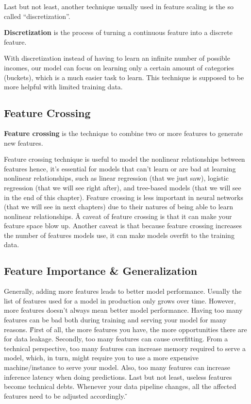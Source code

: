 Last but not least, another technique usually used in feature scaling is the so called ``discretization''.

\bd[Discretization]
\textbf{Discretization} is the process of turning a continuous feature into a discrete feature.
\ed


With discretization instead of having to learn an infinite number of possible incomes, our model can focus on
learning only a certain amount of categories (buckets), which is a much easier task to learn. This technique is
supposed to be more helpful with limited training data.

\subsection{Feature Crossing}

\textbf{Feature crossing} is the technique to combine two or more features to generate new features.
\ed

Feature crossing technique is useful to model the nonlinear relationships between features hence, it's essential for
models that can't learn or are bad at learning nonlinear relationships, such as linear regression (that we just saw),
logistic regression (that we will see right after), and tree-based models (that we will see in the end of this chapter).
Feature crossing is less important in neural networks (that we will see in next chapters) due to their natures of being
able to learn nonlinear relationships. \v

A caveat of feature crossing is that it can make your feature space blow up. Another caveat is that because feature
crossing increases the number of features models use, it can make models overfit to the training data.

\subsection{Feature Importance \& Generalization}

Generally, adding more features leads to better model performance. Usually the list of features used for a model in
production only grows over time. However, more features doesn't always mean better model performance. Having too many
features can be bad both during training and serving your model for many reasons. \v

First of all, the more features you have, the more opportunities there are for data leakage. Secondly, too many
features can cause overfitting. From a technical perspective, too many features can increase memory required to serve
a model, which, in turn, might require you to use a more expensive machine/instance to serve your model. Also, too
many features can increase inference latency when doing predictions. Last but not least, useless features become
technical debts. Whenever your data pipeline changes, all the affected features need to be adjusted accordingly. \v

